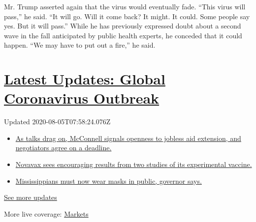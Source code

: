 Mr. Trump asserted again that the virus would eventually fade. ``This
virus will pass,'' he said. ``It will go. Will it come back? It might.
It could. Some people say yes. But it will pass.'' While he has
previously expressed doubt about a second wave in the fall anticipated
by public health experts, he conceded that it could happen. ``We may
have to put out a fire,'' he said.

\hypertarget{latest-updates-global-coronavirus-outbreak}{%
\section{\texorpdfstring{\href{https://www.nytimes3xbfgragh.onion/2020/08/04/world/coronavirus-cases.html?action=click\&pgtype=Article\&state=default\&region=MAIN_CONTENT_1\&context=storylines_live_updates}{Latest
Updates: Global Coronavirus
Outbreak}}{Latest Updates: Global Coronavirus Outbreak}}\label{latest-updates-global-coronavirus-outbreak}}

Updated 2020-08-05T07:58:24.076Z

\begin{itemize}
\tightlist
\item
  \href{https://www.nytimes3xbfgragh.onion/2020/08/04/world/coronavirus-cases.html?action=click\&pgtype=Article\&state=default\&region=MAIN_CONTENT_1\&context=storylines_live_updates\#link-762df92}{As
  talks drag on, McConnell signals openness to jobless aid extension,
  and negotiators agree on a deadline.}
\item
  \href{https://www.nytimes3xbfgragh.onion/2020/08/04/world/coronavirus-cases.html?action=click\&pgtype=Article\&state=default\&region=MAIN_CONTENT_1\&context=storylines_live_updates\#link-1228a480}{Novavax
  sees encouraging results from two studies of its experimental
  vaccine.}
\item
  \href{https://www.nytimes3xbfgragh.onion/2020/08/04/world/coronavirus-cases.html?action=click\&pgtype=Article\&state=default\&region=MAIN_CONTENT_1\&context=storylines_live_updates\#link-794484ed}{Mississippians
  must now wear masks in public, governor says.}
\end{itemize}

\href{https://www.nytimes3xbfgragh.onion/2020/08/04/world/coronavirus-cases.html?action=click\&pgtype=Article\&state=default\&region=MAIN_CONTENT_1\&context=storylines_live_updates}{See
more updates}

More live coverage:
\href{https://www.nytimes3xbfgragh.onion/live/2020/08/04/business/stock-market-today-coronavirus?action=click\&pgtype=Article\&state=default\&region=MAIN_CONTENT_1\&context=storylines_live_updates}{Markets}

